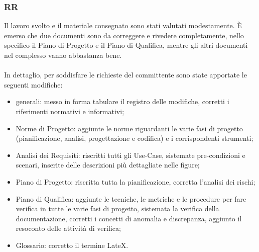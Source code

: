 \subsubsection*{RR}
Il lavoro svolto e il materiale consegnato sono stati valutati modestamente. \`E
emerso che due documenti sono da correggere e rivedere completamente, nello
specifico il Piano di Progetto e il Piano di Qualifica, mentre gli altri documenti nel complesso
vanno abbastanza bene. \\ \\
In dettaglio, per soddisfare le richieste del committente sono state apportate
le seguenti modifiche:
\begin{itemize}
  \item generali: messo in forma tabulare il registro delle modifiche, corretti
  i riferimenti normativi e informativi;
  \item Norme di Progetto: aggiunte le norme riguardanti le varie fasi di
  progetto (pianificazione, analisi, progettazione e codifica) e i corrispondenti strumenti;
  \item Analisi dei Requisiti: riscritti tutti gli Use-Case, sistemate pre-condizioni e scenari,
  inserite delle descrizioni pi\`u dettagliate nelle figure;
  \item Piano di Progetto: riscritta tutta la pianificazione, corretta l'analisi
  dei rischi;
  \item Piano di Qualifica: aggiunte le tecniche, le metriche e le procedure per
  fare verifica in tutte le varie fasi di progetto, sistemata la verifica della
  documentazione, corretti i concetti di anomalia e discrepanza, aggiunto
  il resoconto delle attivit\`a di verifica;
  \item Glossario: corretto il termine LateX.
\end{itemize}

